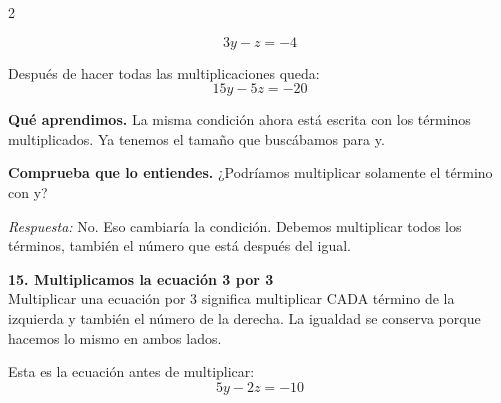 \documentclass[11pt,a4paper,landscape]{article}
\begin{document}
\begin{multicols*}{2}
\begin{minipage}{\linewidth}
\[3y - z = -4\]
\par{}\par\smallskip
\par\smallskip Después de hacer todas las multiplicaciones queda:
\[15y - 5z = -20\]
\par\smallskip\textbf{Qué aprendimos.} La misma condición ahora está escrita con los términos multiplicados. Ya tenemos el tamaño que buscábamos para y.
\par\smallskip\textbf{Comprueba que lo entiendes.} ¿Podríamos multiplicar solamente el término con y?\par\textit{Respuesta:} No. Eso cambiaría la condición. Debemos multiplicar todos los términos, también el número que está después del igual.
\end{minipage}\par\medskip
\noindent\begin{minipage}{\linewidth}\textbf{15. Multiplicamos la ecuación 3 por 3}\\[2pt]Multiplicar una ecuación por 3 significa multiplicar CADA término de la izquierda y también el número de la derecha. La igualdad se conserva porque hacemos lo mismo en ambos lados.
\par\smallskip Esta es la ecuación antes de multiplicar:
\[5y - 2z = -10\]
\par{}\par\smallskip

\end{minipage}
\end{multicols*}
\end{document}

